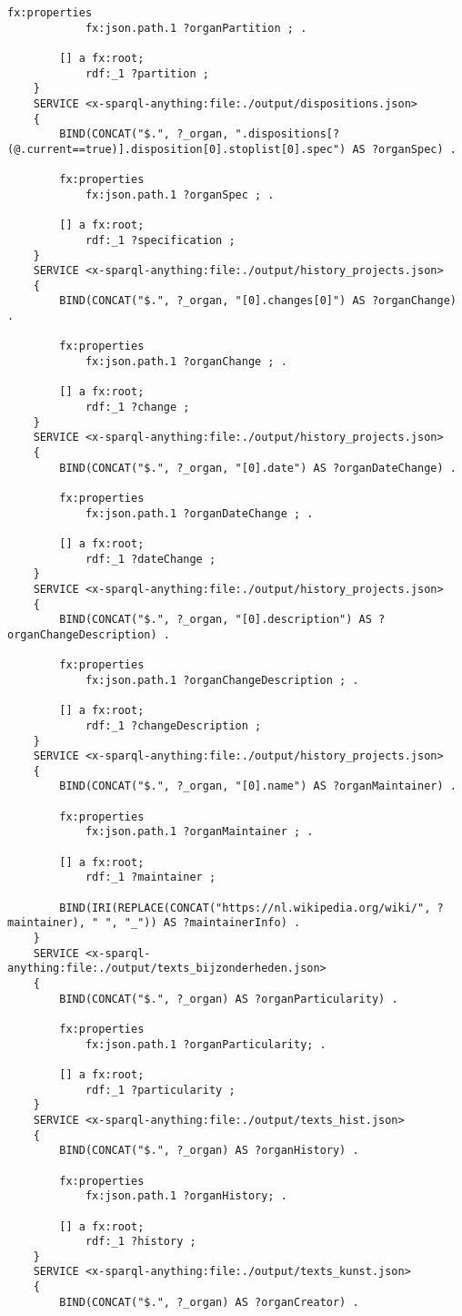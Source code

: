 \begin{lstlisting}[caption={organ-details.sparql}]
		fx:properties
			fx:json.path.1 ?organPartition ; .

		[] a fx:root; 
			rdf:_1 ?partition ;
	} 
	SERVICE <x-sparql-anything:file:./output/dispositions.json>
	{
		BIND(CONCAT("$.", ?_organ, ".dispositions[?(@.current==true)].disposition[0].stoplist[0].spec") AS ?organSpec) .

		fx:properties
			fx:json.path.1 ?organSpec ; .

		[] a fx:root; 
			rdf:_1 ?specification ;
	} 
	SERVICE <x-sparql-anything:file:./output/history_projects.json>
	{
		BIND(CONCAT("$.", ?_organ, "[0].changes[0]") AS ?organChange) .

		fx:properties
			fx:json.path.1 ?organChange ; .

		[] a fx:root; 
			rdf:_1 ?change ;
	} 
	SERVICE <x-sparql-anything:file:./output/history_projects.json>
	{
		BIND(CONCAT("$.", ?_organ, "[0].date") AS ?organDateChange) .

		fx:properties
			fx:json.path.1 ?organDateChange ; .

		[] a fx:root; 
			rdf:_1 ?dateChange ;
	} 
	SERVICE <x-sparql-anything:file:./output/history_projects.json>
	{
		BIND(CONCAT("$.", ?_organ, "[0].description") AS ?organChangeDescription) .

		fx:properties
			fx:json.path.1 ?organChangeDescription ; .

		[] a fx:root; 
			rdf:_1 ?changeDescription ;
	} 
	SERVICE <x-sparql-anything:file:./output/history_projects.json>
	{
		BIND(CONCAT("$.", ?_organ, "[0].name") AS ?organMaintainer) .

		fx:properties
			fx:json.path.1 ?organMaintainer ; .

		[] a fx:root; 
			rdf:_1 ?maintainer ;

		BIND(IRI(REPLACE(CONCAT("https://nl.wikipedia.org/wiki/", ?maintainer), " ", "_")) AS ?maintainerInfo) .
	}
	SERVICE <x-sparql-anything:file:./output/texts_bijzonderheden.json> 
	{
		BIND(CONCAT("$.", ?_organ) AS ?organParticularity) .

		fx:properties
			fx:json.path.1 ?organParticularity; .

		[] a fx:root; 
			rdf:_1 ?particularity ; 
	} 
	SERVICE <x-sparql-anything:file:./output/texts_hist.json> 
	{
		BIND(CONCAT("$.", ?_organ) AS ?organHistory) .

		fx:properties
			fx:json.path.1 ?organHistory; .

		[] a fx:root; 
			rdf:_1 ?history ; 
	}
	SERVICE <x-sparql-anything:file:./output/texts_kunst.json> 
	{
		BIND(CONCAT("$.", ?_organ) AS ?organCreator) .


\end{lstlisting}

